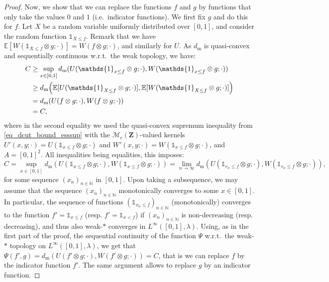 \documentclass{amsart}
\newcommand{\wrt}{w.r.t.\ }
\newcommand{\ie}{i.e.\ }
\theoremstyle{plain}
\theoremstyle{definition}
\newcommand{\Space}{\mathbf{Z}}
\newcommand{\MeasEps}{\mathcal{M}_{\epsilon}(\Space)}
\newcommand{\m}{\mathrm{m}}
\newcommand{\dmeas}{d_\m}
\newcommand{\Esp}{\mathbb{E}}
\newcommand{\ind}{\mathds{1}}
\newcommand{\N}{\mathbb{N}}
\begin{document}
\begin{proof}
Now, we show that we can replace the functions $f$ and $g$ by functions that only take 
	the values $0$ and $1$ (\ie indicator functions).
We first fix $g$ and do this for $f$.
Let $X$ be a random variable uniformly distributed over $[0,1]$,
	and consider the random function $\ind_{X \leq f}$.
Remark that we have $\Esp[ W( \ind_{X\leq f} \otimes  g;\cdot) ] = W( f \otimes g;\cdot)$,
	and similarly for $U$.
As $\dmeas$ is quasi-convex and sequentially continuous \wrt the weak topology,
we have:
\begin{align*}
C & \geq
\sup_{x\in [0,1]} \dmeas ( U(\ind_{x\leq f} \otimes g;\cdot), W(\ind_{x\leq f} \otimes g;\cdot) )  \\
& \geq   \dmeas \Bigl( \Esp[ U(\ind_{X\leq f} \otimes g;\cdot) ], \Esp[ W(\ind_{X\leq f} \otimes g;\cdot)] \Bigr)   \\
& = \dmeas ( U(f \otimes g;\cdot), W(f \otimes g;\cdot) ) \\
& = C,
\end{align*}
where in the second equality we used the quasi-convex supremum inequality from \eqref{eq_dcut_bound_esssup} 
	with the $\MeasEps$-valued kernels $U'(x,y;\cdot) = U(\ind_{x\leq f} \otimes g;\cdot)$
	and $W'(x,y;\cdot) = W(\ind_{x\leq f} \otimes g;\cdot)$, and $A = [0,1]^2$.
All inequalities being equalities, this imposes:
\begin{equation*}
C  = \sup_{x\in [0,1]} \dmeas ( U(\ind_{x\leq f} \otimes g;\cdot), W(\ind_{x\leq f} \otimes g;\cdot) )
= \lim_{n\to\infty} \dmeas ( U(\ind_{r_n\leq f} \otimes g;\cdot), W(\ind_{r_n\leq f} \otimes g;\cdot) ),
\end{equation*}
for some sequence $(x_n)_{n\in\N}$ in $[0,1]$.
Upon taking a subsequence, we may assume that the sequence $(x_n)_{n\in\N}$
	monotonically converges to some $x\in[0,1]$.
In particular, the sequence of functions $(\ind_{x_n\leq f})_{n\in\N}$ (monotonically) converges
	to the function $f' = \ind_{x \leq f}$ (resp. $f' = \ind_{x < f}$) if $(x_n)_{n\in\N}$
	is non-decreasing (resp. decreasing),
	and thus also weak-$*$ converges in $L^\infty([0,1],\lambda)$.
Using, as in the first part of the proof, the sequential continuity of the function $\Psi$
	\wrt the weak-$*$ topology on $L^\infty([0,1],\lambda)$,
	we get that $\Psi(f', g) = \dmeas ( U(f' \otimes g;\cdot), W(f' \otimes g;\cdot) ) = C$,
	that is we can replace $f$ by the indicator function $f'$.
The same argument allows to replace $g$ by an indicator function.
\end{proof}
\end{document}
